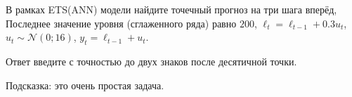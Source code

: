 
\begin{question}
В рамках ETS(ANN) модели найдите точечный прогноз на три шага вперёд,
Последнее значение уровня (сглаженного ряда) равно \(200\), \(\ell_t = \ell_{t-1} + 0.3 u_t\),
\(u_t \sim \mathcal{N}(0; 16)\), \(y_t = \ell_{t-1} + u_t\).

Ответ введите с точностью до двух знаков после десятичной точки.
\end{question}

\begin{solution}
Подсказка: это очень простая задача.
\end{solution}

